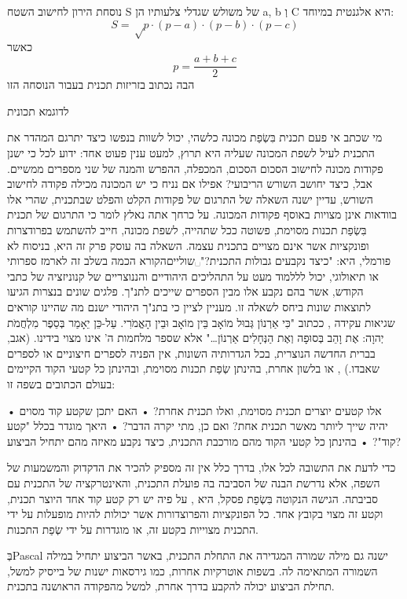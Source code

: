 נוסחת הירון לחישוב השטח S של משולש שגדלי צלעותיו הן a, b וְ C היא אלגנטית במיוחד: \[
S=√{p·(p-a)·(p-b)·(p-c)}
\] כאשר \[
p=\frac{a+b+c}{2}
\] הבה נכתוב בזריזות תכנית  בעבור הנוסחה הזו


{לדוגמא תכונית}

מי שכתב אי פעם תכנית בִּשְׂפַת מכונה כלשהי, יכול לשוות בנפשו כיצד יתרגם המהדר את התכנית לעיל לשפת המכונה שעליה היא תרוץ, למעט ענין פעוט אחד: ידוע לכל כי ישנן פקודות מכונה לחישוב הסכום הסכום, המכפלה, ההפרש והמנה של שני מספרים ממשיים. אבל, כיצד יחושב השורש הריבועי? אפילו אם נניח כי יש המכונה מכילה פקודה לחישוב השורש, עדיין ישנה השאלה של התרגום של פקודות הקלט והפלט שבתכנית, שהרי אלו בוודאות אינן מצויות באוסף פקודות המכונה.
על כרחך אתה נאלץ לומר כי התרגום של תכנית בִּשְׂפַת תכנות מסוימת, פשוטה ככל שתהייה, לשפת מכונה, חייב להשתמש בפרודצרות ופונקציות אשר אינם מצויים בתכנית עצמה. השאלה בה עוסק פרק זה היא, בניסוח לא פורמלי, היא: "כיצד נקבעים גבולות התכנית?"␣שוליים{הקורא הכמה בשלב זה לארמז ספרותי או תיאולוגי, יכול לללמוד מעט על התהליכים היהודיים והננוצריים של קנוניזציה של כתבי הקודש, אשר בהם נקבע אלו מבין הספרים שייכים לתנ"ך. פלגים שונים בנצרות הגיעו לתוצאות שונות ביחס לשאלה זו. מעניין לציין כי בתנ"ך היהודי ישנם מה שהיינו קוראים שגיאות עקידה , ככתוב "כִּי אַרְנוֹן גְּבוּל מוֹאָב בֵּין מוֹאָב וּבֵין הָאֱמֹרִי. עַל-כֵּן יֵאָמַר בְּסֵפֶר מִלְחֲמֹת יְהוָה: אֶת וָהֵב בְּסוּפָה וְאֶת הַנְּחָלִים אַרְנוֹן…" אלא שספר מלחמות ה' אינו מצוי בידינו. (אגב, בברית החדשה הנוצרית, בכל הגדרותיה השונות, אין הפניה לספרים חיצוניים או לספרים שאבדו.)
}, או בלשון אחרת, בהינתן שְׂפַת תכנות מסוימת, ובהינתן כל קטעי הקוד הקיימים בעולם הכתובים בשפה זו:

\begin{itemize}
• אלו קטעים יוצרים תכנית מסוימת, ואלו תכנית אחרת?
• האם יתכן שקטע קוד מסוים יהיה שייך ליותר מאשר תכנית אחת? ואם כן, מתי יקרה הדבר?
• היאך מוגדר בכלל "קטע קוד"?
• בהינתן כל קטעי הקוד מהם מורכבת התכנית, כיצד נקבע מאיזה מהם יתחיל הביצוע?
\end{itemize}

כדי לדעת את התשובה לכל אלו, בדרך כלל אין זה מספיק להכיר את הדקדוק והמשמעות של
השפה, אלא נדרשת הבנה של הסביבה בה פועלת התכנית, והאינטרקציה של התכנית עם
סביבתה.  הגישה הנקוטה בִּשְׂפַת פסקל, היא , על פיה יש רק קטע
קוד אחד היוצר תכנית, וקטע זה מצוי בקובץ אחד. כל הפונקציות והפרוצדורות אשר
יכולות להיות מופעלות על ידי התכנית מצוייות בקטע זה, או מוגדרות על ידי שְׂפַת
התכנות.

בְּPascal ישנה גם מילה שמורה  המגדירה את התחלת התכנית, באשר הביצוע יתחיל במילה השמורה  המתאימה לה. בשפות אוטרקיות אחרות, כמו גירסאות ישנות של בייסיק למשל, תחילת הביצוע יכולה להקבע בדרך אחרת, למשל מהפקודה הראושנה בתכנית.


